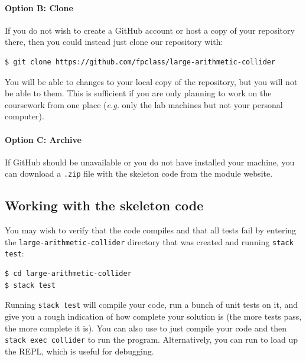 \paragraph{Option B: Clone} If you do not wish to create a GitHub account or host a copy of your repository there, then you could instead just clone our repository with:
\begin{verbatim}
$ git clone https://github.com/fpclass/large-arithmetic-collider
\end{verbatim}
You will be able to  changes to your local copy of the repository, but you will not be able to  them. This is sufficient if you are only planning to work on the coursework from one place (\emph{e.g.} only the lab machines but not your personal computer).

\paragraph{Option C: Archive} If GitHub should be unavailable or you do not have  installed your machine, you can download a \texttt{\small .zip} file with the skeleton code from the module website.

\subsection{Working with the skeleton code}

You may wish to verify that the code compiles and that all tests fail by entering the \texttt{\small large-arithmetic-collider} directory that was created and running \texttt{\small stack test}:
\begin{verbatim}
$ cd large-arithmetic-collider
$ stack test
\end{verbatim}
Running \texttt{\small stack test} will compile your code, run a bunch of unit tests on it, and give you a rough indication of how complete your solution is (the more tests pass, the more complete it is). %
You can also use  to just compile your code and then \texttt{\small stack exec collider} to run the program. Alternatively, you can run  to load up the REPL, which is useful for debugging.

